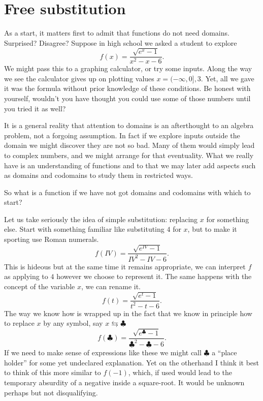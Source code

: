 \section{Free substitution}
As a start, it matters first to admit that functions do not need 
domains.  Surprised? Disagree?    Suppose in high school we asked 
a student to  explore
\[
    f(x) = \frac{\sqrt{e^x-1}}{x^2-x-6}.
\]
We might pass this to a graphing calculator, or try some inputs. Along the way
we see the calculator gives up on plotting values $x=(-\infty,0],3$.  Yet, all
we gave it was the formula without prior knowledge of these conditions.  
Be honest with yourself, wouldn't you have thought you could use some of 
those numbers until you tried it as well?

It is a general reality that attention to domains is an afterthought to an
algebra problem, not a forgoing assumption.  In fact if we explore inputs
outside the domain we might discover they are not so bad.  Many of them would
simply lead to complex numbers, and we might arrange for that eventuality.  
What we really have is an understanding of functions and to that we may later 
add aspects such as domains and codomains to study them in restricted ways.

So what is a function if we have not got domains and codomains with which to start?

Let us take seriously the idea of simple substitution: replacing $x$ for something else.
Start with something familiar like substituting $4$ for $x$, but to make 
it sporting use Roman numerals.
\[
    f(IV) = \frac{\sqrt{e^{IV}-1}}{IV^2-IV-6}.
\]
This is hideous but at the same time it remains appropriate, we can interpret 
$f$ as applying to $4$ however we choose to represent it.  The same happens with 
the concept of the variable $x$, we can rename it.
\[
    f(t) = \frac{\sqrt{e^{t}-1}}{t^2-t-6}.
\]
The way we know how is wrapped up in the fact that we know 
in principle how to replace $x$ by any symbol, say $x\leftrightarrows \clubsuit$
\[
    f(\clubsuit) = \frac{\sqrt{e^{\clubsuit}-1}}{\clubsuit^2-\clubsuit-6}.
\]
If we need to make sense of expressions like these we might call $\clubsuit$ 
a ``place holder'' for some yet undeclared explanation.  Yet on the otherhand 
I think it best to think of this more similar to  $f(-1)$, which, if used 
would lead to the temporary absurdity of a negative inside a square-root.
It would be unknown perhaps but not disqualifying.

